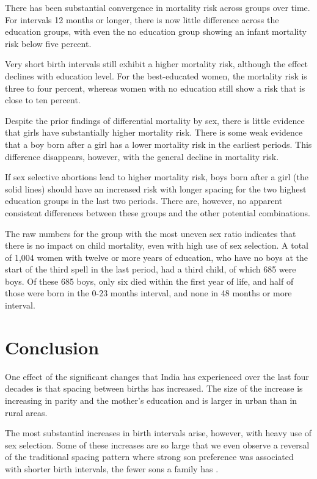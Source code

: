 \documentclass[12pt,letterpaper]{article}
\begin{document}
There has been substantial convergence in mortality risk across groups over time.
For intervals 12 months or longer, there is now little difference across 
the education groups, with even the no education group showing an infant mortality risk 
below five percent.

Very short birth intervals still exhibit a higher mortality risk, although the 
effect declines with education level.
For the best-educated women, the mortality risk is three to four percent,
whereas women with no education still show a risk that is close to ten percent.

Despite the prior findings of differential mortality by sex, there is little evidence 
that girls have substantially higher mortality risk.
There is some weak evidence that a boy born after a girl has a lower mortality
risk in the earliest periods.
This difference disappears, however, with the general decline in mortality risk. 

If sex selective abortions lead to higher mortality risk, boys born after a girl 
(the solid lines)
should have an increased risk with longer spacing for the two highest education groups 
in the last two periods.
There are, however, no apparent consistent differences between these groups and the other 
potential combinations.

The raw numbers for the group with the most uneven sex ratio indicates
that there is no impact on child mortality, even with high use of sex selection. 
A total of 1,004 women with twelve or more years of
education, who have no boys at the start of the third spell in the last
period, had a third child, of which 685 were boys. 
Of these 685 boys, only six died within the first year of life, and half of those were 
born in the 0-23 months interval, and none in 48 months or more interval.



\section{Conclusion\label{sec:conclusion}}



One effect of the significant changes that India has experienced over the last four 
decades is that spacing between births has increased.
The size of the increase is increasing in parity and the mother's
education and is larger in urban than in rural areas.

The most substantial increases in birth intervals arise, however, with
heavy use of sex selection. Some of these increases are so large that we
even observe a reversal of the traditional spacing pattern where strong
son preference was associated with shorter birth intervals, the fewer
sons a family has \citep{ben-porath76b,Leung1988}.
\end{document}
